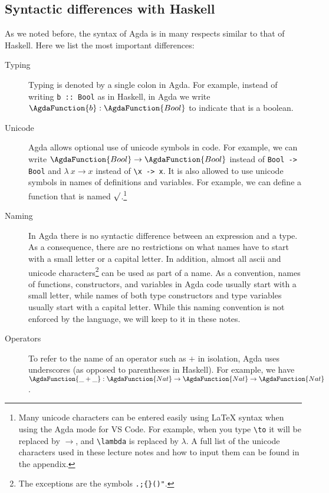 \documentclass[a4paper,UKenglish]{tufte-handout}
\theoremstyle{definition}
\newcommand\fun[1]{{\AgdaFunction{#1}}}
\newcommand\data[1]{{\AgdaFunction{#1}}}
\newcommand\Nat{\data{Nat}}
\newcommand\Bool{\data{Bool}}
\begin{document}
\subsection{Syntactic differences with Haskell}

As we noted before, the syntax of Agda is in many respects similar to
that of Haskell. Here we list the most important differences:

\begin{description}

\item[Typing] Typing is denoted by a single colon in Agda. For example, instead
of writing \texttt{b ::~Bool} as in Haskell, in Agda we write $\fun{b} : \Bool$
to indicate that \fun{b} is a boolean.

\item[Unicode] Agda allows optional use of unicode symbols in
  code. For example, we can write $\Bool \to \Bool$ instead of
  \texttt{Bool -> Bool} and $\lambda\ x \to x$ instead of
  \texttt{\textbackslash x -> x}. It is also allowed to use unicode
  symbols in names of definitions and variables. For example, we can
  define a function that is named $\surd$.\footnote[][-2cm]{Many
    unicode characters can be entered easily using LaTeX syntax when
    using the Agda mode for VS Code. For example, when you type
    \texttt{\textbackslash{}to} it will be replaced by $\to$, and
    \texttt{\textbackslash{}lambda} is replaced by $\lambda$. A full
    list of the unicode characters used in these lecture notes and how
    to input them can be found in the appendix.}

\item[Naming] In Agda there is no syntactic difference between an
  expression and a type. As a consequence, there are no restrictions
  on what names have to start with a small letter or a capital
  letter. In addition, almost all ascii and unicode
  characters\footnote{The exceptions are the symbols
  \texttt{.;\{\}()\@"}.} can be used as part of a name. As a
  convention, names of functions, constructors, and variables in Agda
  code usually start with a small letter, while names of both type
  constructors and type variables usually start with a capital
  letter. While this naming convention is not enforced by the
  language, we will keep to it in these notes.

\item[Operators] To refer to the name of an operator such as $+$ in isolation,
Agda uses underscores (as opposed to parentheses in Haskell). For example, we
have $\fun{\_+\_} : \Nat \to \Nat \to \Nat$.
\marginnote[-1cm]{%
}
\end{description}
\end{document}
